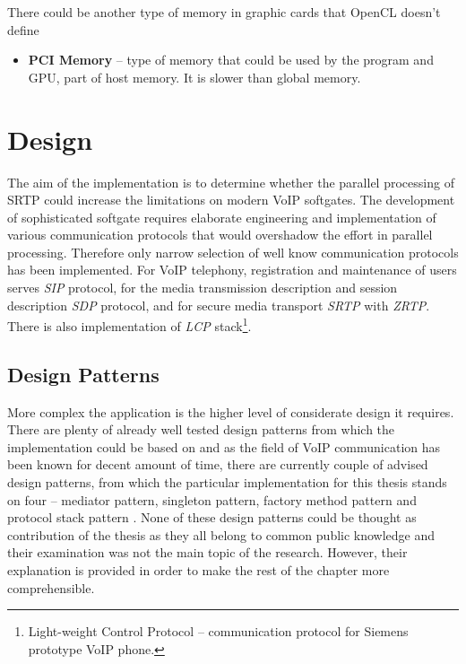 \hspace{-1.5em}
There could be another type of memory in graphic cards that OpenCL doesn't 
define

\begin{itemize}
\item \textbf{PCI Memory} -- type of memory that could be used by the program 
and GPU, part of host memory. It is slower than global memory.
\end{itemize}



\chapter{Design}\label{chapter:design}%
The aim of the implementation is to determine whether the parallel processing
of SRTP could increase the limitations on modern VoIP softgates. The development
of sophisticated softgate requires elaborate engineering and implementation
of various communication protocols that would overshadow the effort in parallel
processing. Therefore only narrow selection of well know communication protocols
has been implemented. For VoIP telephony, registration and maintenance of users
serves \textit{SIP} protocol, for the media transmission description
and session description \textit{SDP} protocol, and for secure media transport 
\textit{SRTP} with \textit{ZRTP}. There is also implementation of \textit{LCP} 
stack\footnote{ Light-weight Control Protocol -- communication protocol for
Siemens prototype VoIP phone.}.


\section{Design Patterns}
More complex the application is the higher level of considerate design it 
requires. There are plenty of already well tested design patterns from
which the implementation could be based on and as the field of VoIP
communication has been known for decent amount of time, there are currently
couple of advised design patterns, from which the particular implementation for 
this thesis stands on four -- mediator pattern, singleton pattern, factory 
method pattern \cite{design-patterns} and protocol stack pattern 
\cite{protocol-stack}. None of these design patterns could be thought as 
contribution of the thesis as they all belong to common public knowledge and 
their examination was not the main topic of the  research. However, their 
explanation is provided in order to make the rest of the chapter more 
comprehensible.

